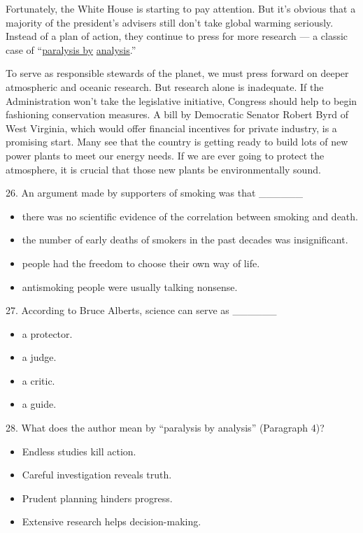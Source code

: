 \documentclass[UTF8,11pt]{ctexart}
\begin{document}
Fortunately, the White House is starting to pay attention. But it’s obvious that a majority of the president’s advisers still don’t take global warming seriously. Instead of a plan of action, they continue to press for more research — a classic case of “\uline{paralysis by} \uline{analysis}.”


To serve as responsible stewards of the planet, we must press forward on deeper atmospheric and oceanic research. But research alone is inadequate. If the Administration won’t take the legislative initiative, Congress should help to begin fashioning conservation measures. A bill by Democratic Senator Robert Byrd of West Virginia, which would offer financial incentives for private industry, is a promising start. Many see that the country is getting ready to build lots of new power plants to meet our energy needs. If we are ever going to protect the atmosphere, it is crucial that those new plants be environmentally sound.


26. An argument made by supporters of smoking was that \_\_\_\_\_\_


\begin{itemize}[leftmargin=2em,itemsep=.2em,topsep=.4em]\item[A.] there was no scientific evidence of the correlation between smoking and death.
\item[B.] the number of early deaths of smokers in the past decades was insignificant.
\item[C.] people had the freedom to choose their own way of life.
\item[D.] antismoking people were usually talking nonsense.
\end{itemize}

27. According to Bruce Alberts, science can serve as \_\_\_\_\_\_


\begin{itemize}[leftmargin=2em,itemsep=.2em,topsep=.4em]\item[A.] a protector.
\item[B.] a judge.
\item[C.] a critic.
\item[D.] a guide.
\end{itemize}

28. What does the author mean by “paralysis by analysis” (Paragraph 4)?


\begin{itemize}[leftmargin=2em,itemsep=.2em,topsep=.4em]\item[A.] Endless studies kill action.
\item[B.] Careful investigation reveals truth.
\item[C.] Prudent planning hinders progress.
\item[D.] Extensive research helps decision-making.
\end{itemize}
\end{document}
